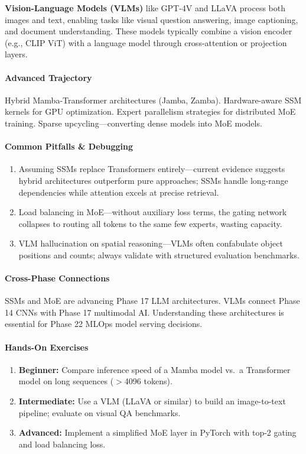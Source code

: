 \documentclass[11pt, a4paper, oneside]{report}
\begin{document}
\textbf{Vision-Language Models (VLMs)} like GPT-4V and LLaVA process both images and text, enabling tasks like visual question answering, image captioning, and document understanding. These models typically combine a vision encoder (e.g., CLIP ViT) with a language model through cross-attention or projection layers.

\paragraph{Advanced Trajectory} Hybrid Mamba-Transformer architectures (Jamba, Zamba). Hardware-aware SSM kernels for GPU optimization. Expert parallelism strategies for distributed MoE training. Sparse upcycling---converting dense models into MoE models.

\paragraph{Common Pitfalls \& Debugging}
\begin{enumerate}[leftmargin=*]
\item Assuming SSMs replace Transformers entirely---current evidence suggests hybrid architectures outperform pure approaches; SSMs handle long-range dependencies while attention excels at precise retrieval.
\item Load balancing in MoE---without auxiliary loss terms, the gating network collapses to routing all tokens to the same few experts, wasting capacity.
\item VLM hallucination on spatial reasoning---VLMs often confabulate object positions and counts; always validate with structured evaluation benchmarks.
\end{enumerate}

\paragraph{Cross-Phase Connections} SSMs and MoE are advancing Phase 17 LLM architectures. VLMs connect Phase 14 CNNs with Phase 17 multimodal AI. Understanding these architectures is essential for Phase 22 MLOps model serving decisions.

\paragraph{Hands-On Exercises}
\begin{enumerate}[leftmargin=*]
\item \textbf{Beginner:} Compare inference speed of a Mamba model vs.\ a Transformer model on long sequences ($>$4096 tokens).
\item \textbf{Intermediate:} Use a VLM (LLaVA or similar) to build an image-to-text pipeline; evaluate on visual QA benchmarks.
\item \textbf{Advanced:} Implement a simplified MoE layer in PyTorch with top-2 gating and load balancing loss.
\end{enumerate}
\end{document}

